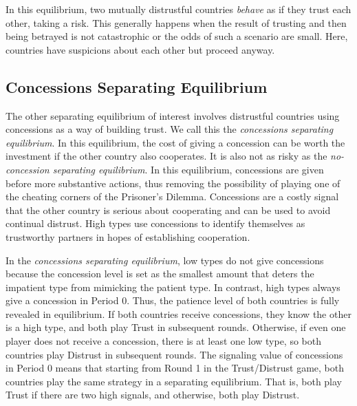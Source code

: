 \documentclass[bibtex,autowc]{apsr_submission}
\begin{document}
In this equilibrium, two mutually distrustful countries \emph{behave} as if they trust each other, taking a risk. This generally happens when the result of trusting and then being betrayed is not catastrophic or the odds of such a scenario are small. Here, countries have suspicions about each other but proceed anyway. 



\subsection{Concessions Separating Equilibrium}
\label{sec:cse}
The other separating equilibrium of interest involves distrustful countries using concessions as a way of building trust. We call this the \emph{concessions separating equilibrium}. In this equilibrium, the cost of giving a concession can be worth the investment if the other country also cooperates. It is also not as risky as the \emph{no-concession separating equilibrium}. In this equilibrium, concessions are given before more substantive actions, thus removing the possibility of playing one of the cheating corners of the Prisoner's Dilemma. Concessions are a costly signal that the other country is serious about cooperating and can be used to avoid continual distrust. High types use concessions to identify themselves as trustworthy partners in hopes of establishing cooperation.

In the \emph{concessions separating equilibrium}, low types do not give concessions because the concession level is set as the smallest amount that deters the impatient type from mimicking the patient type. In contrast, high types always give a concession in Period 0. Thus, the patience level of both countries is fully revealed in equilibrium. If both countries receive concessions, they know the other is a high type, and both play Trust in subsequent rounds. Otherwise, if even one player does not receive a concession, there is at least one low type, so both countries play Distrust in subsequent rounds. The signaling value of concessions in Period 0 means that starting from Round 1 in the Trust/Distrust game, both countries play the same strategy in a separating equilibrium. That is, both play Trust if there are two high signals, and otherwise, both play Distrust.
\end{document}
